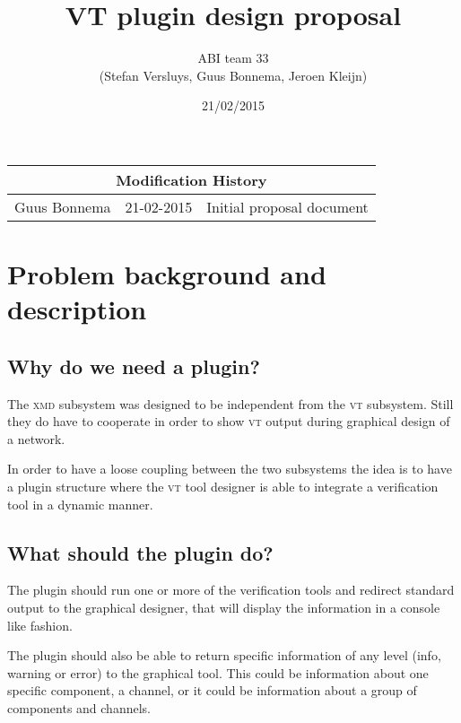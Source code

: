 \documentclass[a4paper,11pt,final]{article}
\author{ABI team 33\\(Stefan Versluys, Guus Bonnema, Jeroen Kleijn)}
\date{21/02/2015}
\title{\color{blue}VT plugin design proposal}
\newcommand{\xmd}{\textsc{xmd}\xspace}%
\newcommand{\vt}{\textsc{vt}\xspace}%
\begin{document}

\maketitle


\begin{tabular}{|l|l|p{20em}|}
\hline 
\multicolumn{3}{|c|}{\bf Modification History}\\\hline
Guus Bonnema & 21-02-2015 & Initial proposal document \\\hline
\end{tabular} 


\maketitle

\tableofcontents

\section{Problem background and description}

\subsection{Why do we need a plugin?}

The \xmd subsystem was designed to be independent from the \vt subsystem. 
Still they do have to cooperate in order to show \vt output during 
graphical design of a network.

In order to have a loose coupling between the two subsystems the idea
is to have a plugin structure where the \vt tool designer is able to 
integrate a verification tool in a dynamic manner. 

\subsection{What should the plugin do?}

The plugin should run one or more of the verification tools and
redirect standard output to the graphical designer, that will
display the information in a console like fashion.

The plugin should also be able to return specific information
of any level (info, warning or error) to the graphical tool. This
could be information about one specific component, a channel, or it
could be information about a group of components and channels.
\end{document}
